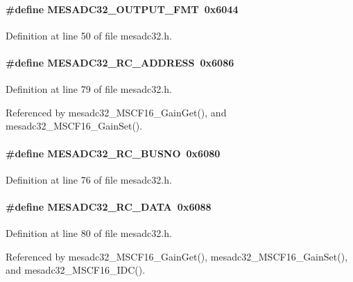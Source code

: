 \paragraph[{MESADC32\_\-OUTPUT\_\-FMT}]{\setlength{\rightskip}{0pt plus 5cm}\#define MESADC32\_\-OUTPUT\_\-FMT~0x6044}\hfill\label{mesadc32_8h_ad15467943c0ecf9e36c016b3108face1}


Definition at line 50 of file mesadc32.h.
\paragraph[{MESADC32\_\-RC\_\-ADDRESS}]{\setlength{\rightskip}{0pt plus 5cm}\#define MESADC32\_\-RC\_\-ADDRESS~0x6086}\hfill\label{mesadc32_8h_a2e00861350efcf4af0714af579bb3b1f}


Definition at line 79 of file mesadc32.h.

Referenced by mesadc32\_\-MSCF16\_\-GainGet(), and mesadc32\_\-MSCF16\_\-GainSet().
\paragraph[{MESADC32\_\-RC\_\-BUSNO}]{\setlength{\rightskip}{0pt plus 5cm}\#define MESADC32\_\-RC\_\-BUSNO~0x6080}\hfill\label{mesadc32_8h_a1f9a875ee38f2ad29734dba1b2625d25}


Definition at line 76 of file mesadc32.h.
\paragraph[{MESADC32\_\-RC\_\-DATA}]{\setlength{\rightskip}{0pt plus 5cm}\#define MESADC32\_\-RC\_\-DATA~0x6088}\hfill\label{mesadc32_8h_a48f33a0ad583af9c0db173689702ecab}


Definition at line 80 of file mesadc32.h.

Referenced by mesadc32\_\-MSCF16\_\-GainGet(), mesadc32\_\-MSCF16\_\-GainSet(), and mesadc32\_\-MSCF16\_\-IDC().

